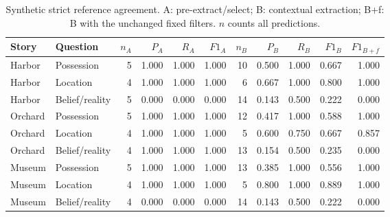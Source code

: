 \begin{table}[t]
\vspace*{6pt}
\caption{Synthetic strict reference agreement. A: pre-extract/select; B: contextual extraction; B+f: B with the unchanged fixed filters. $n$ counts all predictions.}\label{tab:compact}
\centering\small\setlength{\tabcolsep}{4pt}
\begin{tabular}{llrrrrrrrrr}\toprule
Story & Question & $n_A$ & $P_A$ & $R_A$ & $F1_A$ & $n_B$ & $P_B$ & $R_B$ & $F1_B$ & $F1_{B+f}$\\\midrule
Harbor & Possession & 5 & 1.000 & 1.000 & 1.000 & 10 & 0.500 & 1.000 & 0.667 & 1.000 \\
Harbor & Location & 4 & 1.000 & 1.000 & 1.000 & 6 & 0.667 & 1.000 & 0.800 & 1.000 \\
Harbor & Belief/reality & 5 & 0.000 & 0.000 & 0.000 & 14 & 0.143 & 0.500 & 0.222 & 0.000 \\
Orchard & Possession & 5 & 1.000 & 1.000 & 1.000 & 12 & 0.417 & 1.000 & 0.588 & 1.000 \\
Orchard & Location & 4 & 1.000 & 1.000 & 1.000 & 5 & 0.600 & 0.750 & 0.667 & 0.857 \\
Orchard & Belief/reality & 4 & 1.000 & 1.000 & 1.000 & 13 & 0.154 & 0.500 & 0.235 & 0.000 \\
Museum & Possession & 5 & 1.000 & 1.000 & 1.000 & 13 & 0.385 & 1.000 & 0.556 & 1.000 \\
Museum & Location & 4 & 1.000 & 1.000 & 1.000 & 5 & 0.800 & 1.000 & 0.889 & 1.000 \\
Museum & Belief/reality & 4 & 0.000 & 0.000 & 0.000 & 14 & 0.143 & 0.500 & 0.222 & 0.000 \\\bottomrule\end{tabular}\end{table}
